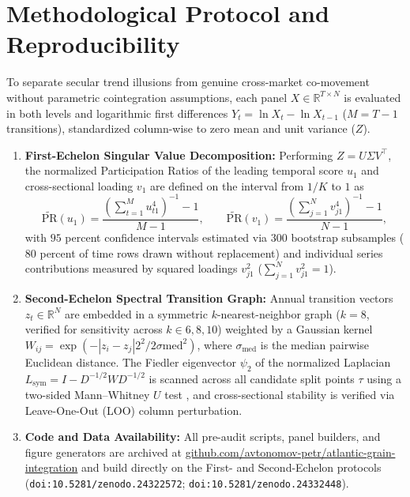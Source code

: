 \documentclass{article}
\begin{document}
\section{Methodological Protocol and Reproducibility}
To separate secular trend illusions from genuine cross-market co-movement without parametric cointegration assumptions, each panel $X \in \mathbb{R}^{T \times N}$ is evaluated in both levels and logarithmic first differences $Y_t = \ln X_t - \ln X_{t-1}$ ($M = T - 1$ transitions), standardized column-wise to zero mean and unit variance ($Z$).
\begin{enumerate}
\item \textbf{First-Echelon Singular Value Decomposition:} Performing $Z = U \Sigma V^\top$, the normalized Participation Ratios of the leading temporal score $u_1$ and cross-sectional loading $v_1$ are defined on the interval from $1/K$ to $1$ as \cite{avtonomov2026a}
\begin{equation*}
\widetilde{\text{PR}}(u_1) = \frac{\left(\sum_{t=1}^{M} u_{t1}^4\right)^{-1} - 1}{M - 1}, \qquad
\widetilde{\text{PR}}(v_1) = \frac{\left(\sum_{j=1}^{N} v_{j1}^4\right)^{-1} - 1}{N - 1},
\end{equation*}
with $95$ percent confidence intervals estimated via $300$ bootstrap subsamples ($80$ percent of time rows drawn without replacement) and individual series contributions measured by squared loadings $v_{j1}^2$ ($\sum_{j=1}^N v_{j1}^2 = 1$).
\item \textbf{Second-Echelon Spectral Transition Graph:} Annual transition vectors $z_t \in \mathbb{R}^N$ are embedded in a symmetric $k$-nearest-neighbor graph ($k=8$, verified for sensitivity across $k \in {6, 8, 10}$) weighted by a Gaussian kernel $W_{ij} = \exp(-|z_i - z_j|2^2 / 2\sigma{\text{med}}^2)$, where $\sigma_{\text{med}}$ is the median pairwise Euclidean distance. The Fiedler eigenvector $\psi_2$ of the normalized Laplacian $L_{\text{sym}} = I - D^{-1/2} W D^{-1/2}$ is scanned across all candidate split points $\tau$ using a two-sided Mann--Whitney $U$ test \cite{avtonomov2026b}, and cross-sectional stability is verified via Leave-One-Out (LOO) column perturbation.
\item \textbf{Code and Data Availability:} All pre-audit scripts, panel builders, and figure generators are archived at \url{github.com/avtonomov-petr/atlantic-grain-integration} and build directly on the First- and Second-Echelon protocols (\texttt{doi:10.5281/zenodo.24322572}; \texttt{doi:10.5281/zenodo.24332448}).
\end{enumerate}
\end{document}
